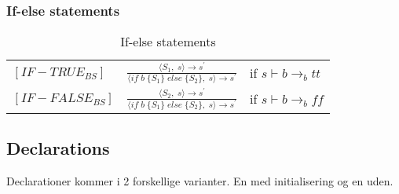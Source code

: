 \noindent \subsubsection{If-else statements}

    \bgroup
    \def\arraystretch{3}
    \begin{table}[H]
    \centering
    \begin{tabular}{l c l}
        
        $[IF-TRUE_{BS}]$ & $
        \frac{\langle S_1,\;s\rangle  \rightarrow s^\prime}
        {\langle if\;b\;\{S_1\}\;else\;\{S_2\},\;s\rangle  \rightarrow s^\prime}
        $ & if $s \vdash b \rightarrow_b tt$ \\
        
        $[IF-FALSE_{BS}]$ & $
        \frac{\langle S_2,\;s\rangle  \rightarrow s^\prime}
        {\langle if\;b\;\{S_1\}\;else\;\{S_2\},\;s\rangle  \rightarrow s^\prime}
        $ & if $s \vdash b \rightarrow_b ff$ \\
        
    \end{tabular}
    \caption{If-else statements}
    \label{tab:ifelse}
    \end{table}
    \egroup

\noindent \subsection{Declarations}
Declarationer kommer i 2 forskellige varianter. En med initialisering og en uden.

